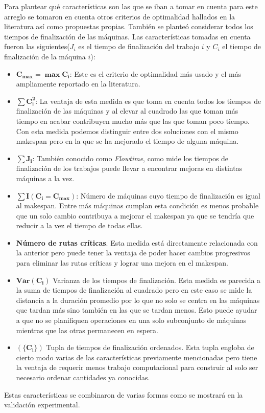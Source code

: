Para plantear qué características son las que se iban a tomar en cuenta para este arreglo se tomaron en cuenta otros criterios de optimalidad hallados en la literatura así como propuestas propias. También se planteó considerar todos los tiempos de finalización de las máquinas. Las características tomadas en cuenta fueron las siguientes($J_i$ es el tiempo de finalización del trabajo $i$ y $C_i$ el tiempo de finalización de la máquina $i$):
\begin{itemize}
    \item $\mathbf{C_{max} = \max{C_i}}$: Este es el criterio de optimalidad más usado y el más ampliamente reportado en la literatura. 
    \item $\mathbf{\sum C_i^2}$: La ventaja de esta medida es que toma en cuenta todos los tiempos de finalización de las máquinas y al elevar al cuadrado las que toman más tiempo en acabar contribuyen mucho más que las que toman poco tiempo. Con esta medida podemos distinguir entre dos soluciones con el mismo makespan pero en la que se ha mejorado el tiempo de alguna máquina.
    \item $\mathbf{\sum J_i}$: También conocido como \textit{Flowtime}, como mide los tiempos de finalización de los trabajos puede llevar a encontrar mejoras en distintas máquinas a la vez.
    \item $\mathbf{\sum I(C_i=C_{max})}$: Número de máquinas cuyo tiempo de finalización es igual al makespan. Entre más máquinas cumplan esta condición es menos probable que un solo cambio contribuya a mejorar el makespan ya que se tendría que reducir a la vez el tiempo de todas ellas. 
    \item \textbf{Número de rutas críticas}. Esta medida está directamente relacionada con la anterior pero puede tener la ventaja de poder hacer cambios progresivos para eliminar las rutas críticas y lograr una mejora en el makespan. 
    \item $\mathbf{Var(C_i)}$ Varianza de los tiempos de finalización. Esta medida es parecida a la suma de tiempos de finalización al cuadrado pero en este caso se mide la distancia a la duración promedio por lo que no solo se centra en las máquinas que tardan más sino también en las que se tardan menos. Esto puede ayudar a que no se planifiquen operaciones en una solo subconjunto de máquinas mientras que las otras permanecen en espera.
    \item $\mathbf{(\{C_i\})}$ Tupla de tiempos de finalización ordenados. Esta tupla engloba de cierto modo varias de las características previamente mencionadas pero tiene la ventaja de requerir menos trabajo computacional para construir al solo ser necesario ordenar cantidades ya conocidas.
\end{itemize}

Estas características se combinaron de varias formas como se mostrará en la validación experimental. 
